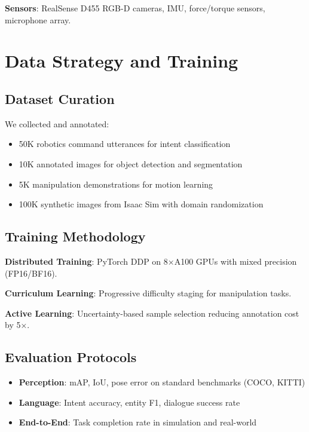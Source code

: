 \documentclass[conference]{IEEEtran}
\begin{document}
\textbf{Sensors}: RealSense D455 RGB-D cameras, IMU, force/torque sensors, microphone array.

\section{Data Strategy and Training}
\label{sec:data}

\subsection{Dataset Curation}

We collected and annotated:
\begin{itemize}
    \item 50K robotics command utterances for intent classification
    \item 10K annotated images for object detection and segmentation
    \item 5K manipulation demonstrations for motion learning
    \item 100K synthetic images from Isaac Sim with domain randomization
\end{itemize}

\subsection{Training Methodology}

\textbf{Distributed Training}: PyTorch DDP on 8×A100 GPUs with mixed precision (FP16/BF16).

\textbf{Curriculum Learning}: Progressive difficulty staging for manipulation tasks.

\textbf{Active Learning}: Uncertainty-based sample selection reducing annotation cost by 5×.

\subsection{Evaluation Protocols}

\begin{itemize}
    \item \textbf{Perception}: mAP, IoU, pose error on standard benchmarks (COCO, KITTI)
    \item \textbf{Language}: Intent accuracy, entity F1, dialogue success rate
    \item \textbf{End-to-End}: Task completion rate in simulation and real-world
\end{itemize}
\end{document}
